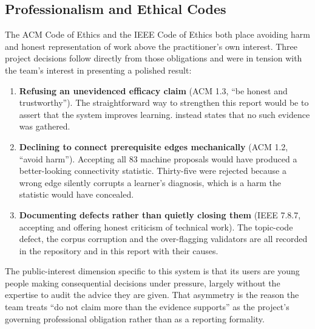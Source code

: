 \subsection{Professionalism and Ethical Codes}
\label{sec:codes}

The ACM Code of Ethics \cite{acm2018code} and the IEEE Code of Ethics
\cite{ieee2020code} both place avoiding harm and honest representation of work
above the practitioner's own interest. Three project decisions follow directly
from those obligations and were in tension with the team's interest in
presenting a polished result:

\begin{enumerate}
  \item \textbf{Refusing an unevidenced efficacy claim} (ACM 1.3, ``be honest and
    trustworthy''). The straightforward way to strengthen this report would be
    to assert that the system improves learning.  instead
    states that no such evidence was gathered.
  \item \textbf{Declining to connect prerequisite edges mechanically}
    (ACM 1.2, ``avoid harm''). Accepting all 83 machine proposals would have
    produced a better-looking connectivity statistic. Thirty-five were rejected
    because a wrong edge silently corrupts a learner's diagnosis, which is a harm
    the statistic would have concealed.
  \item \textbf{Documenting defects rather than quietly closing them}
    (IEEE 7.8.7, accepting and offering honest criticism of technical work). The
    topic-code defect, the corpus corruption and the over-flagging validators are
    all recorded in the repository and in this report with their causes.
\end{enumerate}

The public-interest dimension specific to this system is that its users are
young people making consequential decisions under pressure, largely without the
expertise to audit the advice they are given. That asymmetry is the reason the
team treats ``do not claim more than the evidence supports'' as the project's
governing professional obligation rather than as a reporting formality.
